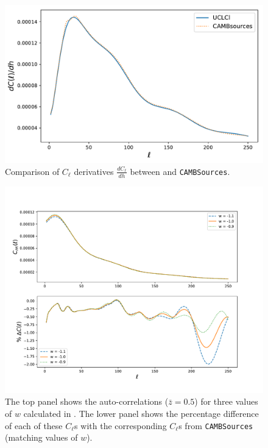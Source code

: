 \begin{figure}
\begin{center}
\includegraphics[scale=0.60]{BOSS-FIGS/PrecDh.pdf}
\caption{Comparison of $C_{\ell}$ derivatives $\frac{d C_{\ell}}{dh}$ between \uclcl and \texttt{CAMBSources}.}
\label{fig:Diff_h}
\end{center}
\end{figure}

\begin{figure}
\begin{center}
\includegraphics[scale=0.60]{BOSS-FIGS/PrecW.pdf}
\caption[Auto-correlations ($\bar z = 0.5$) for three values of $w$ calculated in \uclcl and comparison between \class and \texttt{CAMBSources}]{The top panel shows the auto-correlations ($\bar z = 0.5$) for three values of $w$ calculated in \uclcl. The lower panel shows the percentage difference of each of these $C_{\ell}$s with the corresponding $C_{\ell}$s from \texttt{CAMBSources} (matching values of $w$).}
\label{fig:w_Precision}
\end{center}
\end{figure}

